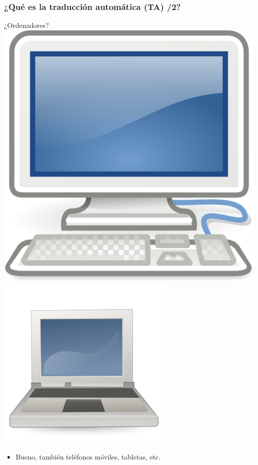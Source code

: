 \documentclass{beamer}
\begin{document}
\begin{frame}
  
\frametitle{¿Qué es la traducción automática (TA) /2?}

¿Ordenadores? \includegraphics[scale=0.02]{computer.png}
\includegraphics[scale=0.16]{laptop.png}\pause
\begin{itemize}
\item Bueno, también teléfonos móviles, tabletas, etc. 

\end{itemize}
\end{frame}
\end{document}
